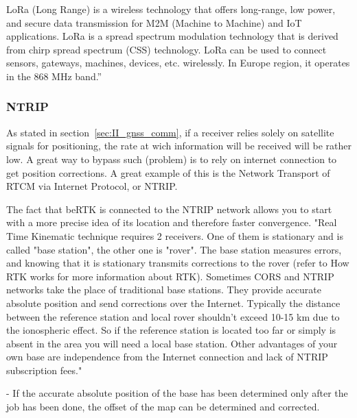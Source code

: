 LoRa (Long Range) is a wireless technology that offers long-range, low power, and secure data transmission for M2M (Machine to Machine) and IoT applications. LoRa is a spread spectrum modulation technology that is derived from chirp spread spectrum (CSS) technology. LoRa can be used to connect sensors, gateways, machines, devices, etc. wirelessly. In Europe region, it operates in the 868 MHz band.'' %

\subsubsection{NTRIP}\label{sec:II_ntrip}

As stated in section~\ref{sec:II_gnss_comm}, if a receiver relies solely on satellite signals for positioning, the rate at wich information will be received will be rather low. A great way to bypass such (problem) is to rely on internet connection to get position corrections. A great example of this is the Network Transport of RTCM via Internet Protocol, or NTRIP.

The fact that beRTK is connected to the NTRIP network allows you to start with a more precise idea of its location and therefore faster convergence.
"Real Time Kinematic technique requires 2 receivers. One of them is stationary and is called "base station", the other one is "rover". The base station measures errors, and knowing that it is stationary transmits corrections to the rover (refer to How RTK works for more information about RTK). Sometimes CORS and NTRIP networks take the place of traditional base stations. They provide accurate absolute position and send corrections over the Internet. Typically the distance between the reference station and local rover shouldn't exceed 10-15 km due to the ionospheric effect. So if the reference station is located too far or simply is absent in the area you will need a local base station. Other advantages of your own base are independence from the Internet connection and lack of NTRIP subscription fees."

- If the accurate absolute position of the base has been determined only after the job has been done, the offset of the map can be determined and corrected.


